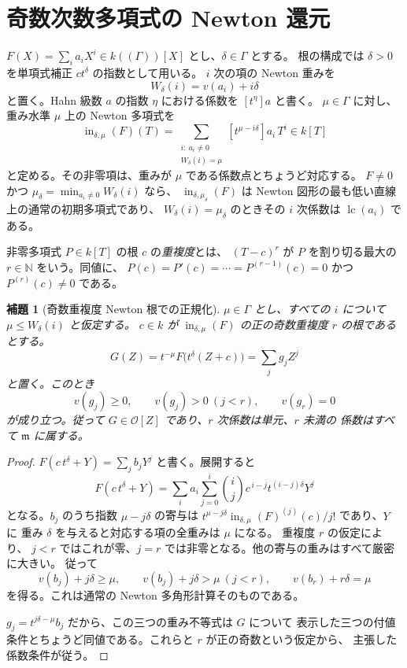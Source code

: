 \documentclass[11pt,uplatex,dvipdfmx]{jsarticle}
\newcommand{\Val}{v}
\newcommand{\lc}{\operatorname{lc}}
\newcommand{\Init}{\operatorname{in}}
\newcommand{\Ocal}{\mathcal O}
\theoremstyle{proofnote}
\newtheorem{lemma}[theorem]{補題}
\begin{document}
\section{奇数次数多項式の Newton 還元}
\label{sec:newton-reduction}

\(F(X)=\sum_i a_iX^i\in k((\Gamma))[X]\) とし、\(\delta\in\Gamma\) とする。
根の構成では \(\delta>0\) を単項式補正 \(ct^\delta\) の指数として用いる。
\(i\) 次の項の Newton 重みを
\[
  W_\delta(i)=\Val(a_i)+i\delta
\]
と置く。Hahn 級数 \(a\) の指数 \(\eta\) における係数を \([t^\eta]a\) と書く。
\(\mu\in\Gamma\) に対し、重み水準 \(\mu\) 上の Newton 多項式を
\[
  \Init_{\delta,\mu}(F)(T)
  =
  \sum_{\substack{i:\ a_i\ne0\\ W_\delta(i)=\mu}}
    [t^{\mu-i\delta}]a_i\,T^i\in k[T]
\]
と定める。その非零項は、重みが \(\mu\) である係数点とちょうど対応する。
\(F\ne0\) かつ \(\mu_\delta=\min_{a_i\ne0}W_\delta(i)\) なら、
\(\Init_{\delta,\mu_\delta}(F)\) は Newton 図形の最も低い直線上の通常の初期多項式であり、
\(W_\delta(i)=\mu_\delta\) のときその \(i\) 次係数は \(\lc(a_i)\) である。

非零多項式 \(P\in k[T]\) の根 \(c\) の\emph{重複度}とは、
\((T-c)^r\) が \(P\) を割り切る最大の \(r\in\mathbb N\) をいう。同値に、
\(P(c)=P'(c)=\cdots=P^{(r-1)}(c)=0\) かつ \(P^{(r)}(c)\ne0\) である。

\begin{lemma}[奇数重複度 Newton 根での正規化]
\label{lem:newton-correction}
  \(\mu\in\Gamma\) とし、すべての \(i\) について \(\mu\le W_\delta(i)\) と仮定する。
  \(c\in k\) が \(\Init_{\delta,\mu}(F)\) の正の奇数重複度 \(r\) の根であるとする。
  \[
    G(Z)=t^{-\mu}F\bigl(t^\delta(Z+c)\bigr)=\sum_j g_jZ^j
  \]
  と置く。このとき
  \[
    \Val(g_j)\ge0,\qquad
    \Val(g_j)>0\ (j<r),\qquad
    \Val(g_r)=0
  \]
  が成り立つ。従って \(G\in\Ocal[Z]\) であり、\(r\) 次係数は単元、\(r\) 未満の
  係数はすべて \(\mathfrak m\) に属する。
\end{lemma}
\begin{proof}
  \(F(c\,t^\delta+Y)=\sum_j b_jY^j\) と書く。展開すると
  \[
    F(c\,t^\delta+Y)
    =
    \sum_i a_i\sum_{j=0}^i\binom ij
       c^{\,i-j}t^{(i-j)\delta}Y^j
  \]
  となる。\(b_j\) のうち指数 \(\mu-j\delta\) の寄与は
  \(t^{\mu-j\delta}\Init_{\delta,\mu}(F)^{(j)}(c)/j!\) であり、\(Y\) に
  重み \(\delta\) を与えると対応する項の全重みは \(\mu\) になる。
  重複度 \(r\) の仮定により、
  \(j<r\) ではこれが零、\(j=r\) では非零となる。他の寄与の重みはすべて厳密に大きい。
  従って
  \[
    \Val(b_j)+j\delta\ge\mu,\qquad
    \Val(b_j)+j\delta>\mu\ (j<r),\qquad
    \Val(b_r)+r\delta=\mu
  \]
  を得る。これは通常の Newton 多角形計算そのものである。

  \(g_j=t^{j\delta-\mu}b_j\) だから、この三つの重み不等式は \(G\) について
  表示した三つの付値条件とちょうど同値である。これらと \(r\) が正の奇数という仮定から、
  主張した係数条件が従う。
\end{proof}
\end{document}

